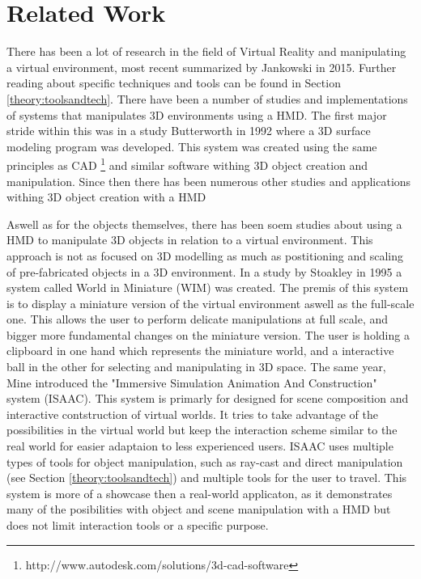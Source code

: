 \chapter{Related Work}
There has been a lot of research in the field of Virtual Reality and manipulating a virtual environment, most recent summarized by Jankowski in 2015. \cite{interactions:Jankowski2015} Further reading about specific techniques and tools can be found in Section \ref{theory:toolsandtech}. There have been a number of studies and implementations of systems that manipulates 3D environments using a HMD. The first major stride within this was in a study Butterworth in 1992 where a 3D surface modeling program was developed. \cite{relatedwork:Butterworth1992} This system was created using the same principles as CAD \footnote{http://www.autodesk.com/solutions/3d-cad-software} and similar software withing 3D object creation and manipulation. Since then there has been numerous other studies and applications withing 3D object creation with a HMD \cite{relatedwork:bowman1996conceptual} \cite{relatedwork:moshell1995research} \cite{relatedwork:liang1994jdcad}

Aswell as for the objects themselves, there has been soem studies about using a HMD to manipulate 3D objects in relation to a virtual environment. This approach is not as focused on 3D modelling as much as postitioning and scaling of pre-fabricated objects in a 3D environment. In a study by Stoakley in 1995 a system called World in Miniature (WIM) was created.\cite{relatedwork:stoakley1995virtual} The premis of this system is to display a miniature version of the virtual environment aswell as the full-scale one. This allows the user to perform delicate manipulations at full scale, and bigger more fundamental changes on the miniature version. The user is holding a clipboard in one hand which represents the miniature world, and a interactive ball in the other for selecting and manipulating in 3D space. The same year, Mine introduced the "Immersive Simulation
Animation And Construction" system (ISAAC).\cite{relatedwork:mine1995isaac} This system is primarly for designed for scene composition and interactive contstruction of virtual worlds. It tries to take advantage of the possibilities in the virtual world but keep the interaction scheme similar to the real world for easier adaptaion to less experienced users. ISAAC uses multiple types of tools for object manipulation, such as ray-cast and direct manipulation (see Section \ref{theory:toolsandtech}) and multiple tools for the user to travel. This system is more of a showcase then a real-world applicaton, as it demonstrates many of the posibilities with object and scene manipulation with a HMD but does not limit interaction tools or a specific purpose.

